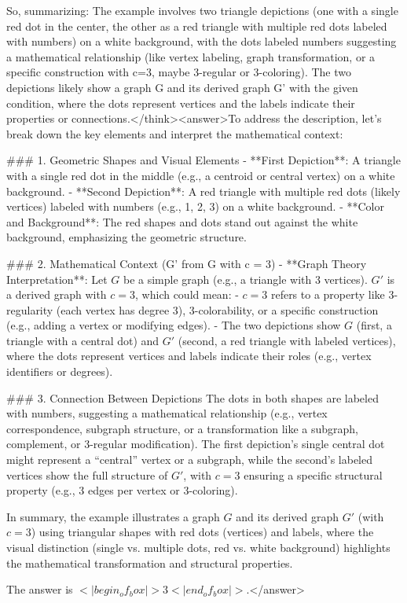 So, summarizing: The example involves two triangle depictions (one with a single red dot in the center, the other as a red triangle with multiple red dots labeled with numbers) on a white background, with the dots labeled numbers suggesting a mathematical relationship (like vertex labeling, graph transformation, or a specific construction with c=3, maybe 3-regular or 3-coloring). The two depictions likely show a graph G and its derived graph G' with the given condition, where the dots represent vertices and the labels indicate their properties or connections.</think><answer>To address the description, let’s break down the key elements and interpret the mathematical context:  

### 1. Geometric Shapes and Visual Elements  
- **First Depiction**: A triangle with a single red dot in the middle (e.g., a centroid or central vertex) on a white background.  
- **Second Depiction**: A red triangle with multiple red dots (likely vertices) labeled with numbers (e.g., 1, 2, 3) on a white background.  
- **Color and Background**: The red shapes and dots stand out against the white background, emphasizing the geometric structure.    

### 2. Mathematical Context (G’ from G with c = 3)  
- **Graph Theory Interpretation**: Let \( G \) be a simple graph (e.g., a triangle with 3 vertices). \( G' \) is a derived graph with \( c = 3 \), which could mean:  
  - \( c = 3 \) refers to a property like 3-regularity (each vertex has degree 3), 3-colorability, or a specific construction (e.g., adding a vertex or modifying edges).  
  - The two depictions show \( G \) (first, a triangle with a central dot) and \( G' \) (second, a red triangle with labeled vertices), where the dots represent vertices and labels indicate their roles (e.g., vertex identifiers or degrees).  

### 3. Connection Between Depictions  
The dots in both shapes are labeled with numbers, suggesting a mathematical relationship (e.g., vertex correspondence, subgraph structure, or a transformation like a subgraph, complement, or 3-regular modification). The first depiction’s single central dot might represent a “central” vertex or a subgraph, while the second’s labeled vertices show the full structure of \( G' \), with \( c = 3 \) ensuring a specific structural property (e.g., 3 edges per vertex or 3-coloring).    

In summary, the example illustrates a graph \( G \) and its derived graph \( G' \) (with \( c = 3 \)) using triangular shapes with red dots (vertices) and labels, where the visual distinction (single vs. multiple dots, red vs. white background) highlights the mathematical transformation and structural properties.  

The answer is \(<|begin_of_box|>3<|end_of_box|>\).</answer>